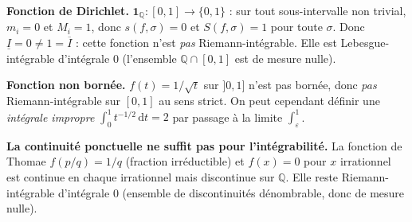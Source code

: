 \vspace{6pt}

\begin{mdframed}[style=cexbar]
  \textbf{Fonction de Dirichlet.}\enspace{}
  $\mathbf{1}_{\mathbb{Q}}:[0,1]\to\{0,1\}$ : sur tout sous-intervalle non
  trivial, $m_i = 0$ et $M_i = 1$, donc $s(f,\sigma) = 0$ et $S(f,\sigma) = 1$
  pour toute $\sigma$. Donc $\underline{I} = 0 \neq 1 = \overline{I}$ :
  cette fonction n'est \emph{pas} Riemann-intégrable. Elle est Lebesgue-intégrable
  d'intégrale $0$ (l'ensemble $\mathbb{Q}\cap[0,1]$ est de mesure nulle).

  \smallskip\noindent
  \textbf{Fonction non bornée.}\enspace%
  $f(t) = 1/\sqrt{t}$ sur $]0,1]$ n'est pas bornée, donc \emph{pas}
  Riemann-intégrable sur $[0,1]$ au sens strict. On peut cependant définir
  une \emph{intégrale impropre} $\int_0^1 t^{-1/2}\,\mathrm{d}t = 2$
  par passage à la limite $\int_\varepsilon^1$.

  \smallskip\noindent
  \textbf{La continuité ponctuelle ne suffit pas pour l'intégrabilité.}\enspace%
  La fonction de Thomae $f(p/q) = 1/q$ (fraction irréductible) et $f(x) = 0$
  pour $x$ irrationnel est continue en chaque irrationnel mais discontinue
  sur $\mathbb{Q}$. Elle reste Riemann-intégrable d'intégrale $0$
  (ensemble de discontinuités dénombrable, donc de mesure nulle).
\end{mdframed}

\vspace{6pt}
\exolabel

